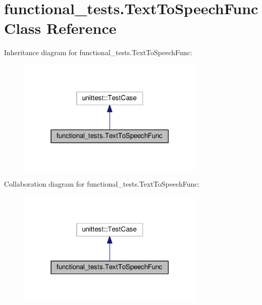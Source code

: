\hypertarget{classfunctional__tests_1_1TextToSpeechFunc}{\section{functional\-\_\-tests.\-Text\-To\-Speech\-Func Class Reference}
\label{classfunctional__tests_1_1TextToSpeechFunc}
}


Inheritance diagram for functional\-\_\-tests.\-Text\-To\-Speech\-Func\-:
\nopagebreak
\begin{figure}[H]
\begin{center}
\leavevmode
\includegraphics[width=254pt]{classfunctional__tests_1_1TextToSpeechFunc__inherit__graph}
\end{center}
\end{figure}


Collaboration diagram for functional\-\_\-tests.\-Text\-To\-Speech\-Func\-:
\nopagebreak
\begin{figure}[H]
\begin{center}
\leavevmode
\includegraphics[width=254pt]{classfunctional__tests_1_1TextToSpeechFunc__coll__graph}
\end{center}
\end{figure}
